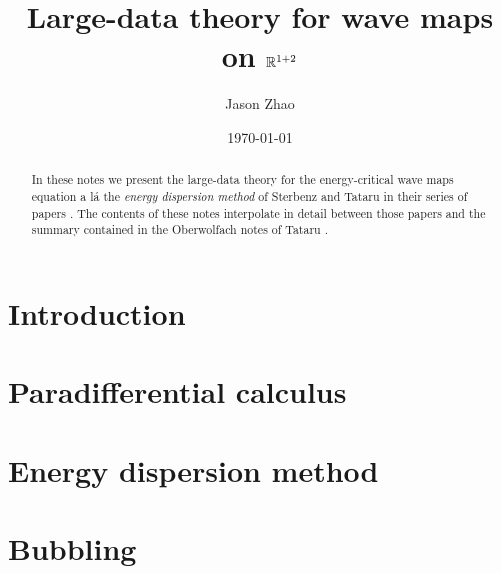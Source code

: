 \documentclass[reqno]{amsart}
\title
{
	Large-data theory for wave maps on $\mathbb R^{1 + 2}$
}
\author{Jason Zhao}
\date{\today}
\begin{document}
\maketitle

\begin{abstract}
	In these notes we present the large-data theory for the energy-critical wave maps equation a l\'a the \textit{energy dispersion method} of Sterbenz and Tataru in their series of papers	\cite{SterbenzTataru2010a, SterbenzTataru2010}.
The contents of these notes interpolate in detail between those papers and the summary contained in the Oberwolfach notes of Tataru \cite[Geometric Wave Equations]{KochEtAl2014}. 
\end{abstract}

\tableofcontents

\section{Introduction}


\section{Paradifferential calculus}


\section{Energy dispersion method}


\section{Bubbling}




\end{document}
